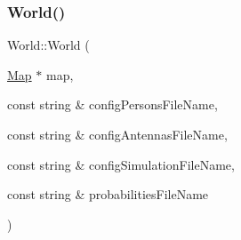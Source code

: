 \subsubsection{\texorpdfstring{World()}{World()}}
{\footnotesize\ttfamily World\+::\+World (\begin{DoxyParamCaption}\item[{\hyperlink{class_map}{Map} $\ast$}]{map,  }\item[{const string \&}]{config\+Persons\+File\+Name,  }\item[{const string \&}]{config\+Antennas\+File\+Name,  }\item[{const string \&}]{config\+Simulation\+File\+Name,  }\item[{const string \&}]{probabilities\+File\+Name }\end{DoxyParamCaption})\hspace{0.3cm}{\ttfamily [noexcept]}}

